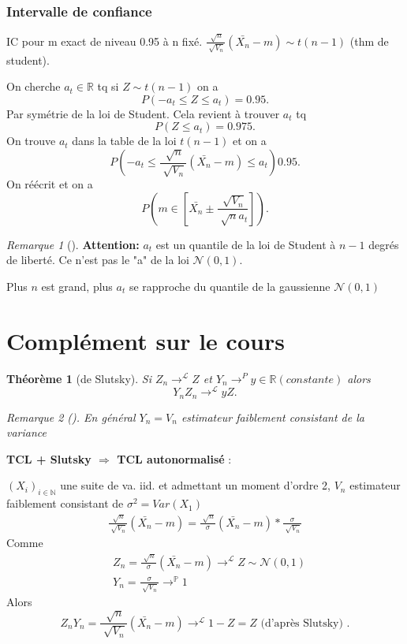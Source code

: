 \documentclass{article}
\theoremstyle{plain}%
\newtheorem{thm}{Théorème}[section]
\theoremstyle{definition}
\theoremstyle{remark}
\newtheorem*{rem}{Remarque}
\begin{document}
\subsubsection{Intervalle de confiance}
IC pour m exact de niveau 0.95 à n fixé. $ \frac{\sqrt[]{n}}{\sqrt[]{V_n}} (\bar{X_n} - m ) \sim t(n-1) $ (thm de student). 

On cherche $ a_t \in \mathbb{R}$ tq si $ Z \sim t(n-1) $ on a 
\[
    P(-a_t \leq Z \leq a_t) = 0.95
.\]
Par symétrie de la loi de Student. Cela revient à trouver $ a_t $ tq 
\[
    P(Z \leq a_t) = 0.975
.\]
On trouve $ a_t $ dans la table de la loi $ t(n-1) $ et on a 
\[
    P(-a_t \leq \frac{\sqrt[]{n}}{\sqrt[]{V_n}} (\bar{X_n} -m ) \leq a_t) 0.95
.\]
On réécrit et on a 
\[
    P(m \in [\bar{X_n} \pm  \frac{\sqrt[]{V_n}}{\sqrt[]{n} a_t}])
.\]
\begin{rem}[]
    \textbf{Attention:} $ a_t $ est un quantile de la loi de Student à $ n-1 $ degrés de liberté. Ce n'est pas le "a" de la loi $ \mathcal{N}(0,1) $.

    Plus $ n $ est grand, plus $ a_t $ se rapproche du quantile de la gaussienne $ \mathcal{N}(0,1) $ 
\end{rem}

\section{Complément sur le cours}

\begin{thm}[de Slutsky]
    Si $ Z_n \to ^{\mathcal{L}} Z$  et $ Y_n \to ^{P} y \in \mathbb{R} (constante)$ alors 
    \[
        Y_n Z_n \to ^{\mathcal{L}} y Z
    .\]
    \begin{rem}[]
        En général $ Y_n = V_n $ estimateur faiblement consistant de la variance
    \end{rem}
\end{thm}

\textbf{TCL + Slutsky $\Rightarrow$ TCL autonormalisé} : 

$ (X_i)_{i \in \mathbb{N}} $ une suite de va. iid. et admettant un moment d'ordre 2, $ V_n $ estimateur faiblement consistant de $ \sigma ^2 = Var(X_1) $ 
\begin{align*}
    \frac{\sqrt[]{n}}{\sqrt[]{V_n}} (\bar{X_n} - m ) = \frac{\sqrt[]{n}}{\sigma} (\bar{X_n} - m) * \frac{\sigma }{\sqrt[]{V_n}}
\end{align*}
Comme 
\begin{align*}
    & Z_n = \frac{\sqrt[]{n}}{\sigma }(\bar{X_n} - m) \to ^\mathcal{L} Z \sim \mathcal{N}(0,1) \\
    & Y_n = \frac{\sigma }{\sqrt[]{V_n}} \to ^{\mathbb{P}} 1
\end{align*}
Alors 
\[
    Z_n Y_n = \frac{\sqrt[]{n}}{\sqrt[]{V_n}} (\bar{X_n} - m) \to ^\mathcal{L} 1 - Z = Z \text{ (d'après Slutsky) }
.\]
\end{document}

